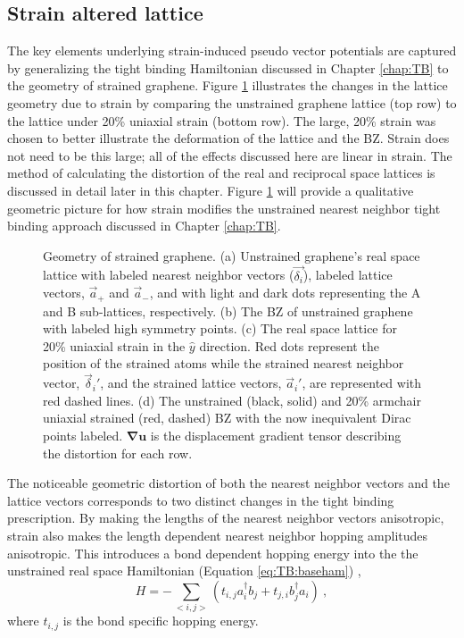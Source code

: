 \subsection{Strain altered lattice}
The key elements underlying strain-induced pseudo vector potentials are captured by generalizing the tight binding Hamiltonian discussed in Chapter \ref{chap:TB} to the geometry of strained graphene.
Figure \ref{fig:PVP:lattice} illustrates the changes in the lattice geometry due to strain by comparing the unstrained graphene lattice (top row) to the lattice under 20\% uniaxial strain (bottom row).
The large, 20\% strain was chosen to better illustrate the deformation of the lattice and the BZ.
Strain does not need to be this large; all of the effects discussed here are linear in strain.
The method of calculating the distortion of the real and reciprocal space lattices is discussed in detail later in this chapter.
Figure \ref{fig:PVP:lattice} will provide a qualitative geometric picture for how strain modifies the unstrained nearest neighbor tight binding approach discussed in Chapter \ref{chap:TB}.

\begin{figure}
  
  \caption[Geometry of strained graphene]{\label{fig:PVP:lattice} Geometry of strained graphene.  (a) Unstrained graphene's real space lattice with labeled nearest neighbor vectors ($\vec{\delta_i}$), labeled lattice vectors, $\vec{a}_+$ and  $\vec{a}_-$, and with light and dark dots representing the A and B sub-lattices, respectively. (b) The BZ of unstrained graphene with labeled high symmetry points. (c) The real space lattice for 20\% uniaxial strain in the $\hat{y}$ direction.  Red dots represent the position of the strained atoms while the strained nearest neighbor vector, $\vec{\delta}_i'$, and the strained lattice vectors, $\vec{a}_i'$, are represented with red dashed lines.  (d) The unstrained (black, solid) and 20\% armchair uniaxial strained (red, dashed) BZ with the now inequivalent Dirac points labeled.  $\bm{\nabla u}$ is the displacement gradient tensor describing the distortion for each row.}
\end{figure}

The noticeable geometric distortion of both the nearest neighbor vectors and the lattice vectors corresponds to two distinct changes in the tight binding prescription.
By making the lengths of the nearest neighbor vectors anisotropic, strain also makes the length dependent nearest neighbor hopping amplitudes anisotropic.
This introduces a bond dependent hopping energy into the the unstrained real space Hamiltonian (Equation \ref{eq:TB:baseham}) \cite{Hasegawa2006},
\begin{equation}
  H=-\sum_{<i,j>} \left( t_{i,j} a_i^{\dagger} b_j + t_{j,i} b_j^{\dagger} a_i \right) \ ,
  \label{eq:PVP:RealSpace}
\end{equation}
where $t_{i,j}$ is the bond specific hopping energy.

